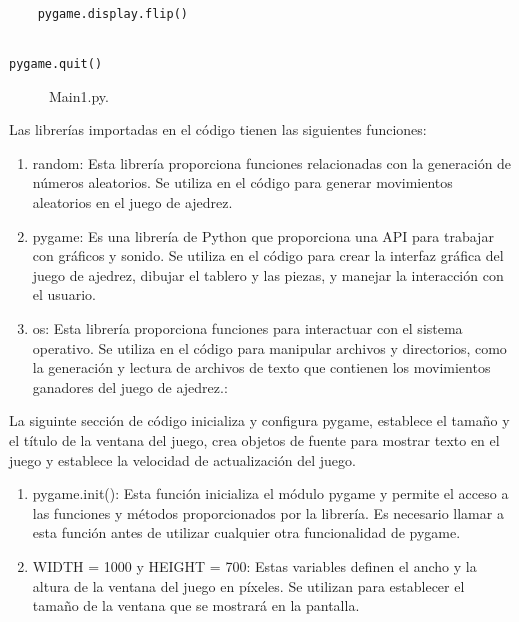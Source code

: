 \begin{enumerate}
\begin{lstlisting}
    pygame.display.flip()


pygame.quit()

\end{lstlisting}
\begin{figure}[h]
\begin{center}
\end{center}
\caption{Main1.py.}
\label{fig:imagen}
\end{figure}
\newpage
Las librerías importadas en el código tienen las siguientes funciones:
\begin{enumerate}
    \item random: Esta librería proporciona funciones relacionadas con la generación de números aleatorios. Se utiliza en el código para generar movimientos aleatorios en el juego de ajedrez.\newline

    \item pygame: Es una librería de Python que proporciona una API para trabajar con gráficos y sonido. Se utiliza en el código para crear la interfaz gráfica del juego de ajedrez, dibujar el tablero y las piezas, y manejar la interacción con el usuario.\newline
    
    \item os: Esta librería proporciona funciones para interactuar con el sistema operativo. Se utiliza en el código para manipular archivos y directorios, como la generación y lectura de archivos de texto que contienen los movimientos ganadores del juego de ajedrez.:\newline
\end{enumerate}

La siguinte sección de código inicializa y configura pygame, establece el tamaño y el título de la ventana del juego, crea objetos de fuente para mostrar texto en el juego y establece la velocidad de actualización del juego.
\begin{enumerate}
    \item pygame.init(): Esta función inicializa el módulo pygame y permite el acceso a las funciones y métodos proporcionados por la librería. Es necesario llamar a esta función antes de utilizar cualquier otra funcionalidad de pygame.\newline

    \item WIDTH = 1000 y HEIGHT = 700: Estas variables definen el ancho y la altura de la ventana del juego en píxeles. Se utilizan para establecer el tamaño de la ventana que se mostrará en la pantalla.\newline
    

\end{enumerate}
\end{enumerate}
